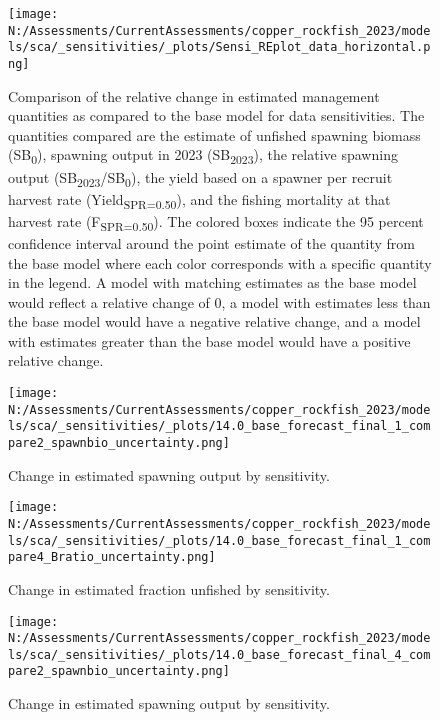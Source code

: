 \documentclass[11pt,
  english,
  letterpaper,
]{article}
\begin{document}
\newpage

\begin{figure}
\centering
\texttt{[image: N:/Assessments/CurrentAssessments/copper\_rockfish\_2023/models/sca/\_sensitivities/\_plots/Sensi\_REplot\_data\_horizontal.png]}
\caption{Comparison of the relative change in estimated management quantities as compared to the base model for data sensitivities. The quantities compared are the estimate of unfished spawning biomass (SB\textsubscript{0}), spawning output in 2023 (SB\textsubscript{2023}), the relative spawning output (SB\textsubscript{2023}/SB\textsubscript{0}), the yield based on a spawner per recruit harvest rate (Yield\textsubscript{SPR=0.50}), and the fishing mortality at that harvest rate (F\textsubscript{SPR=0.50}). The colored boxes indicate the 95 percent confidence interval around the point estimate of the quantity from the base model where each color corresponds with a specific quantity in the legend. A model with matching estimates as the base model would reflect a relative change of 0, a model with estimates less than the base model would have a negative relative change, and a model with estimates greater than the base model would have a positive relative change.\label{fig:sens-data}}
\end{figure}

\newpage

\begin{figure}
\centering
\texttt{[image: N:/Assessments/CurrentAssessments/copper\_rockfish\_2023/models/sca/\_sensitivities/\_plots/14.0\_base\_forecast\_final\_1\_compare2\_spawnbio\_uncertainty.png]}
\caption{Change in estimated spawning output by sensitivity.\label{fig:sens-ssb-1}}
\end{figure}

\newpage

\begin{figure}
\centering
\texttt{[image: N:/Assessments/CurrentAssessments/copper\_rockfish\_2023/models/sca/\_sensitivities/\_plots/14.0\_base\_forecast\_final\_1\_compare4\_Bratio\_uncertainty.png]}
\caption{Change in estimated fraction unfished by sensitivity.\label{fig:sens-depl-1}}
\end{figure}

\newpage

\begin{figure}
\centering
\texttt{[image: N:/Assessments/CurrentAssessments/copper\_rockfish\_2023/models/sca/\_sensitivities/\_plots/14.0\_base\_forecast\_final\_4\_compare2\_spawnbio\_uncertainty.png]}
\caption{Change in estimated spawning output by sensitivity.\label{fig:sens-ssb-4}}
\end{figure}
\end{document}
